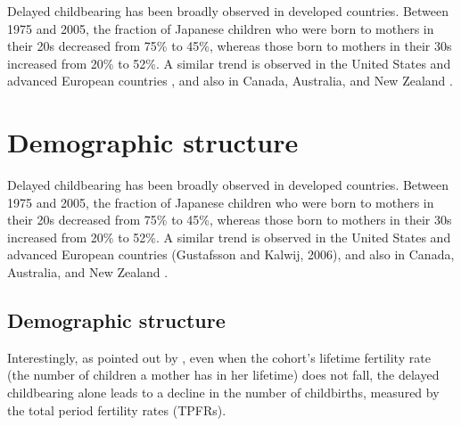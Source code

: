 \documentclass[nogrid]{MBE}%
\begin{document}
{Delayed childbearing has been broadly observed in developed countries. Between 1975 and 2005, the
fraction of Japanese children who were born to mothers in their 20s decreased from 75\% to 45\%,
whereas those born to mothers in their 30s increased from 20\% to 52\%. A similar trend is
observed in the United States and advanced European countries \citet{Bryant_Galtier_Poursat:2005},
and
also in Canada, Australia, and New Zealand \citep{Efron:1979}. %



\section{Demographic structure}

Delayed childbearing has been broadly observed in developed countries. Between 1975 and 2005, the
fraction of Japanese children who were born to mothers in their 20s decreased from 75\% to 45\%,
whereas those born to mothers in their 30s increased from 20\% to 52\%. A similar trend is
observed in the United States and advanced European countries (Gustafsson and Kalwij, 2006), and
also in Canada, Australia, and New Zealand \citep{Efron:1979}.

\subsection{Demographic structure}

Interestingly, as pointed out by \citep{Miller:1974,Efron:1979}, even when the cohort's lifetime
fertility rate (the number of children a mother has in her lifetime) does not fall, the delayed
childbearing alone leads to a decline in the number of childbirths, measured by the total period
fertility rates (TPFRs).

}
\end{document}
